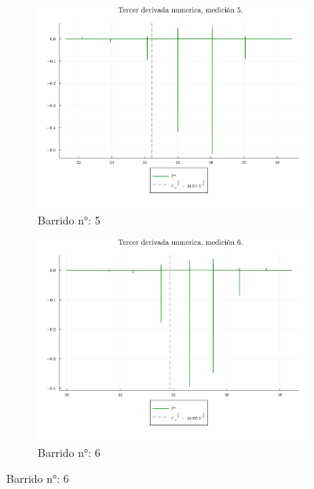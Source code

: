 \begin{figure}[H]
	\ContinuedFloat %
	\centering
	\begin{subfigure}[b]{0.49\textwidth}
		\centering
		\includegraphics[width=\linewidth]{img/potderst5.png}
		\caption{Barrido n°: 5}
		\label{fig:potderst5}
	\end{subfigure}
	\hfill
	\begin{subfigure}[b]{0.49\textwidth}
		\centering
		\includegraphics[width=\linewidth]{img/potderst6.png}
		\caption{Barrido n°: 6}
		\label{fig:potderst6}
	\end{subfigure}
	
\end{figure}

